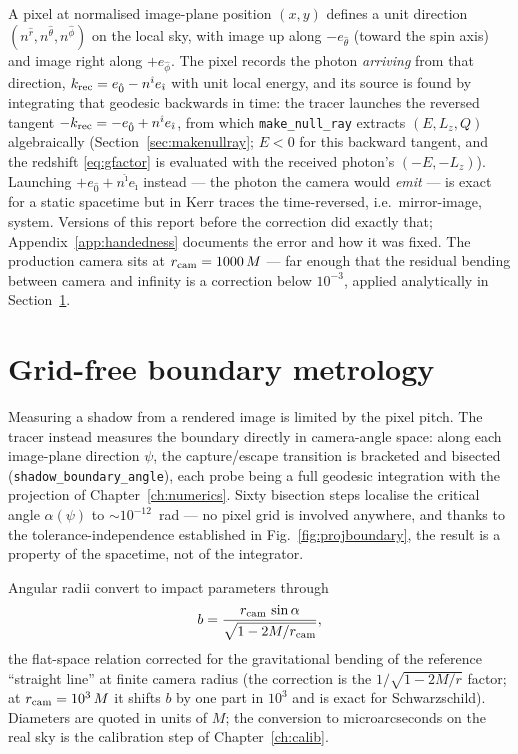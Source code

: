 A pixel at normalised image-plane position $(x, y)$ defines a unit
direction $(n^{\hat r}, n^{\hat\theta}, n^{\hat\phi})$ on the local sky,
with image up along $-e_{\hat\theta}$ (toward the spin axis) and image
right along $+e_{\hat\phi}$. The pixel records the photon
\emph{arriving} from that direction, $k_{\rm rec} = e_{\hat 0} -
n^{\hat\imath} e_{\hat\imath}$ with unit local energy, and its source is
found by integrating that geodesic backwards in time: the tracer
launches the reversed tangent $-k_{\rm rec} = -e_{\hat 0} +
n^{\hat\imath} e_{\hat\imath}$, from which \texttt{make\_null\_ray}
extracts $(E, L_z, Q)$ algebraically (Section~\ref{sec:makenullray};
$E < 0$ for this backward tangent, and the redshift \eqref{eq:gfactor}
is evaluated with the received photon's $(-E, -L_z)$). Launching
$+e_{\hat 0} + n^{\hat\imath} e_{\hat\imath}$ instead — the photon the
camera would \emph{emit} — is exact for a static spacetime but in Kerr
traces the time-reversed, i.e.\ mirror-image, system. Versions of this
report before the correction did exactly that;
Appendix~\ref{app:handedness} documents the error and how it was fixed. The production camera
sits at $r_{\rm cam} = 1000\,M$ — far
enough that the residual bending between camera and infinity is a
correction below $10^{-3}$, applied analytically in
Section~\ref{sec:metrology}.

\section{Grid-free boundary metrology}
\label{sec:metrology}

Measuring a shadow from a rendered image is limited by the pixel pitch.
The tracer instead measures the boundary directly in camera-angle space:
along each image-plane direction $\psi$, the capture/escape transition
is bracketed and bisected (\texttt{shadow\_boundary\_angle}), each probe
being a full geodesic integration with the projection of
Chapter~\ref{ch:numerics}. Sixty bisection steps localise the critical
angle $\alpha(\psi)$ to $\sim$$10^{-12}$~rad — no pixel grid is involved
anywhere, and thanks to the tolerance-independence established in
Fig.~\ref{fig:projboundary}, the result is a property of the spacetime,
not of the integrator.

Angular radii convert to impact parameters through
\begin{equation}
b = \frac{r_{\rm cam}\,\sin\alpha}{\sqrt{1 - 2M/r_{\rm cam}}},
\label{eq:btoalpha}
\end{equation}
the flat-space relation corrected for the gravitational bending of the
reference ``straight line'' at finite camera radius (the correction is
the $1/\sqrt{1-2M/r}$ factor; at $r_{\rm cam} = 10^3\,M$ it shifts $b$
by one part in $10^3$ and is exact for Schwarzschild). Diameters are
quoted in units of $M$; the conversion to microarcseconds on the real
sky is the calibration step of Chapter~\ref{ch:calib}.

